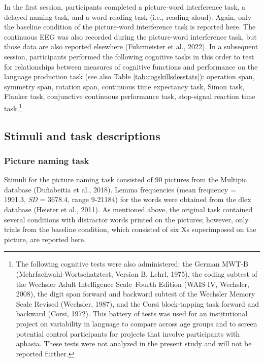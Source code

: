 \documentclass[
  man,floatsintext]{apa6}
\begin{document}
In the first session, participants completed a picture-word interference task, a delayed naming task, and a word reading task (i.e., reading aloud). Again, only the baseline condition of the picture-word interference task is reported here. The continuous EEG was also recorded during the picture-word interference task, but those data are also reported elsewhere (Fuhrmeister et al., 2022). In a subsequent session, participants performed the following cognitive tasks in this order to test for relationships between measures of cognitive functions and performance on the language production task (see also Table \ref{tab:cogskillsdesstats}): operation span, symmetry span, rotation span, continuous time expectancy task, Simon task, Flanker task, conjunctive continuous performance task, stop-signal reaction time task.\footnote{The following cognitive tests were also administered: the German MWT-B (Mehrfachwahl-Wortschatztest, Version B, Lehrl, 1975), the coding subtest of the Wechsler Adult Intelligence Scale--Fourth Edition (WAIS-IV, Wechsler, 2008), the digit span forward and backward subtest of the Wechsler Memory Scale Revised (Wechsler, 1987), and the Corsi block-tapping task forward and backward (Corsi, 1972). This battery of tests was used for an institutional project on variability in language to compare across age groups and to screen potential control participants for projects that involve participants with aphasia. These tests were not analyzed in the present study and will not be reported further.}

\hypertarget{stimuli-and-task-descriptions}{%
\subsection{Stimuli and task descriptions}\label{stimuli-and-task-descriptions}}

\hypertarget{picture-naming-task}{%
\subsubsection{Picture naming task}\label{picture-naming-task}}

Stimuli for the picture naming task consisted of 90 pictures from the Multipic database (Duñabeitia et al., 2018). Lemma frequencies (mean frequency = 1991.3, \emph{SD} = 3678.4, range 9-21184) for the words were obtained from the dlex database (Heister et al., 2011). As mentioned above, the original task contained several conditions with distractor words printed on the pictures; however, only trials from the baseline condition, which consisted of six Xs superimposed on the picture, are reported here.
\end{document}
